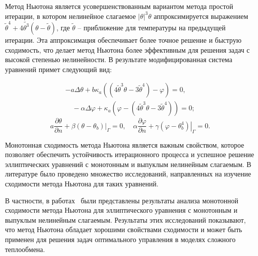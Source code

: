 Метод Ньютона является усовершенствованным вариантом метода простой итерации,
в котором нелинейное слагаемое $|\theta|^3 \theta$ аппроксимируется
выражением $\widetilde{\theta}^4+4 \widetilde{\theta^3}(\theta-\widetilde{\theta})$,
где $\widetilde{\theta}$ -- приближение для температуры на предыдущей итерации.
Эта аппроксимация обеспечивает более точное решение и быструю сходимость,
что делает метод Ньютона более эффективным для
решения задач с высокой степенью нелинейности.
В результате модифицированная система уравнений примет следующий вид:

\begin{equation}
    \tag{L1}
    \label{eq:L1}
    \begin{gathered}
        -a \Delta \theta+b \kappa_{a}\left(\left(4 \widetilde{\theta}^{3}
        \theta-3 \widetilde{\theta}^{4}\right)-\varphi\right)=0,\\
        \quad-\alpha \Delta \varphi
        +\kappa_{a}\left(\varphi
        -\left(4 \widetilde{\theta}^{3}
        \theta-3 \widetilde{\theta}^{4}\right)\right)=0;
    \end{gathered}
\end{equation}
\begin{equation}
    \tag{L2}
    \label{eq:L2}
    a \frac{\partial \theta}{\partial n}
    +\left.\beta\left(\theta-\theta_{b}\right)\right|_{\Gamma}=0,
    \quad \alpha \frac{\partial \varphi}{\partial n}
    +\left.\gamma\left(\varphi-\theta_{b}^{4}\right)\right|_{\Gamma}=0.
\end{equation}

Монотонная сходимость метода Ньютона является важным свойством,
которое позволяет обеспечить устойчивость итерационного процесса
и успешное решение эллиптических уравнений
с монотонным и выпуклым нелинейным слагаемым.
В литературе было проведено множество исследований, направленных
на изучение сходимости метода Ньютона для таких уравнений.

В частности, в работах~\cite{Mukhamadiev1971, Schryer1971} были представлены
результаты анализа монотонной сходимости метода Ньютона для эллиптического
уравнения с монотонным и выпуклым нелинейным слагаемым.
Результаты этих исследований показывают, что метод Ньютона обладает
хорошими свойствами сходимости и может быть применен для решения
задач оптимального управления в моделях сложного теплообмена.

